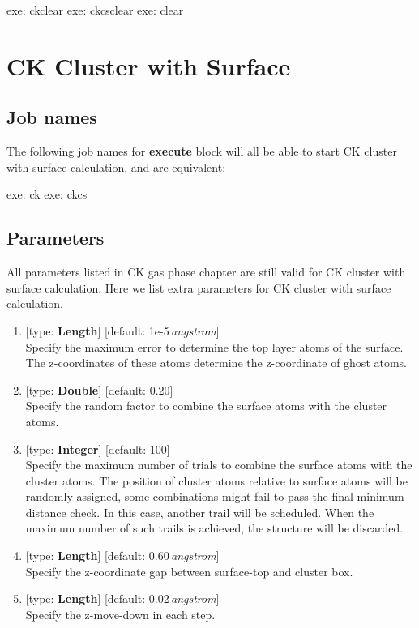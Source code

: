 \documentclass[11pt]{book}
\begin{document}
\begin{everbatim}
{ exe: ckclear }
{ exe: ckcsclear }
{ exe: clear }
\end{everbatim}

\chapter{CK Cluster with Surface}


\section{Job names}

The following job names for \textbf{execute} block will all be able to start CK cluster with surface calculation, and are equivalent:

\begin{everbatim}
{ exe: ck }
{ exe: ckcs }
\end{everbatim}

\section{Parameters}

All parameters listed in CK gas phase chapter are still valid for CK cluster with surface calculation. Here we list extra parameters 
for CK cluster with surface calculation.

\begin{enumerate}
\item {} [type: \textbf{Length}] [default: 1e-5\,\emph{angstrom}] \\
	Specify the maximum error to determine the top layer atoms of the surface. The z-coordinates of these atoms determine the 
	z-coordinate of ghost atoms.
\item {} [type: \textbf{Double}] [default: 0.20] \\
	Specify the random factor to combine the surface atoms with the cluster atoms.
\item {} [type: \textbf{Integer}] [default: 100] \\
	Specify the maximum number of trials to combine the surface atoms with the cluster atoms. The position of cluster atoms relative to 
	surface atoms will be randomly assigned, some combinations might fail to pass the final minimum distance check. In this case, another 
	trail will be scheduled. When the maximum number of such trails is achieved, the structure will be discarded.
\item {} [type: \textbf{Length}] [default: 0.60\,\emph{angstrom}] \\
	Specify the z-coordinate gap between surface-top and cluster box.
\item {} [type: \textbf{Length}] [default: 0.02\,\emph{angstrom}] \\
	Specify the z-move-down in each step.
\end{enumerate}
\end{document}

